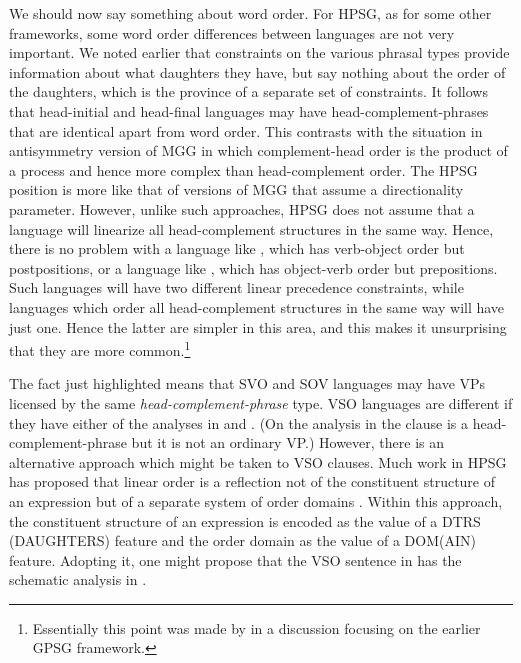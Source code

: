 \documentclass[output=paper]{langsci/langscibook}
\begin{document}
We should now say something about word order. For \gls{HPSG}, as for some other
frameworks, some word order differences between languages are not very
important. We noted earlier that constraints on the various phrasal types
provide information about what daughters they have, but say nothing about the
order of the daughters, which is the province of a separate set of constraints.
It follows that head-initial and head-final languages may have
head-complement-phrases that are identical apart from word order. This
contrasts with the situation in  antisymmetry version of
\gls{MGG} in which complement-head order is the product of a  process
and hence more complex than head-complement order. The \gls{HPSG} position is more
like that of versions of \gls{MGG} that assume a directionality parameter.
However, unlike such approaches, \gls{HPSG} does not assume that a language will
linearize all head-complement structures in the same way. Hence, there is no
problem with a language like , which has verb-object order but
postpositions, or a language like , which has object-verb order but
prepositions. Such languages will have two different linear precedence
constraints, while languages which order all head-complement structures in the
same way will have just one. Hence the latter are simpler in this area, and
this makes it unsurprising that they are more common.\footnote{Essentially this
point was made by \citet{FodCra1990} in a discussion focusing on the
earlier \gls{GPSG} framework.}

The fact just highlighted means that SVO and SOV languages may have VPs
licensed by the same \emph{head-complement-phrase} type. VSO languages are
different if they have either of the analyses in  and
. (On the analysis in  the clause is a
head-complement-phrase but it is not an ordinary VP.) However, there is an
alternative approach which might be taken to VSO clauses. Much work in
\gls{HPSG} has proposed that linear order is a reflection not of the
constituent structure of an expression but of a separate system of order
domains \parencite[see][]{Reape1992,Muller1996,Kathol2000}.  Within this
approach, the constituent structure of an expression is encoded as the value of
a DTRS (DAUGHTERS) feature and the order domain as the value of a DOM(AIN)
feature. Adopting it, one might propose that the  VSO sentence in
 has the schematic analysis in .
\end{document}
